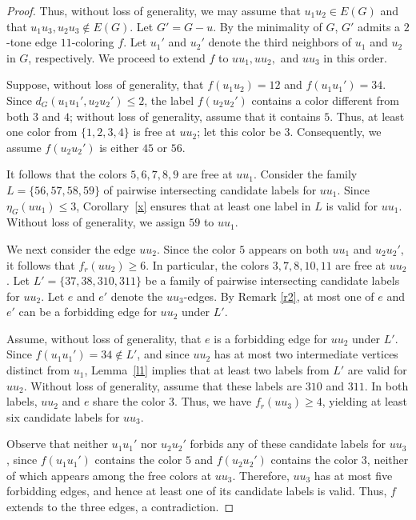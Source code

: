 \documentclass[12pt]{article}
\theoremstyle{plain}
\numberwithin{theorem}{section}
\numberwithin{conjecture}{section}
\numberwithin{corollary}{section}
\numberwithin{example}{section}
\numberwithin{lemma}{section}
\numberwithin{proposition}{section}
\numberwithin{problem}{section}
\numberwithin{remark}{section}
\numberwithin{claim}{theorem}
\numberwithin{definition}{section}
\begin{document}
\begin{proof}
\noindent Thus, without loss of generality, we may assume that $u_1u_2\in E(G)$ and that $u_1u_3,u_2u_3\notin E(G)$. Let $G' = G - u$. By the minimality of $G$, $G'$ admits a $2$-tone edge $11$-coloring $f$. Let $u_1'$ and $u_2'$ denote the third neighbors of $u_1$ and $u_2$ in $G$, respectively. We proceed to extend $f$ to $uu_1, uu_2,$ and $uu_3$ in this order.

\noindent Suppose, without loss of generality, that $f(u_1u_2)=12$ and $f(u_1u_1')=34$. Since $d_G(u_1u_1',u_2u_2')\le2$, the label $f(u_2u_2')$ contains a color different from both $3$ and $4$; without loss of generality, assume that it contains $5$. Thus, at least one color from $\{1,2,3,4\}$ is free at $uu_2$; let this color be $3$. Consequently, we assume $f(u_2u_2')$ is either $45$ or $56$.

\noindent It follows that the colors $5,6,7,8,9$ are free at $uu_1$. Consider the family $L=\{56, 57, 58, 59\}$ of pairwise intersecting candidate labels for $uu_1$. Since $\eta_G(uu_1)\le 3$, Corollary~\ref{x} ensures that at least one label in $L$ is valid for $uu_1$. Without loss of generality, we assign $59$ to $uu_1$.

\noindent We next consider the edge $uu_2$. Since the color $5$ appears on both $uu_1$ and $u_2u_2'$, it follows that $f_r(uu_2)\ge 6$. In particular, the colors $3,7,8,10,11$ are free at $uu_2$. Let $L'=\{37,38,310,311\}$ be a family of pairwise intersecting candidate labels for $uu_2$. Let $e$ and $e'$ denote the $uu_3$-edges. By Remark \ref{r2}, at most one of $e$ and $e'$ can be a forbidding edge for $uu_2$ under $L'$.

\noindent Assume, without loss of generality, that $e$ is a forbidding edge for $uu_2$ under $L'$. Since $f(u_1u_1')=34 \notin L'$, and since $uu_2$ has at most two intermediate vertices distinct from $u_1$, Lemma~\ref{l1} implies that at least two labels from $L'$ are valid for $uu_2$. Without loss of generality, assume that these labels are $310$ and $311$. In both labels, $uu_2$ and $e$ share the color $3$. Thus, we have $f_r(uu_3) \ge 4$, yielding at least six candidate labels for $uu_3$.

\noindent Observe that neither $u_1u_1'$ nor $u_2u_2'$ forbids any of these candidate labels for $uu_3$, since $f(u_1u_1')$ contains the color $5$ and $f(u_2u_2')$ contains the color $3$, neither of which appears among the free colors at $uu_3$. Therefore, $uu_3$ has at most five forbidding edges, and hence at least one of its candidate labels is valid. Thus, $f$ extends to the three edges, a contradiction.


\end{proof}
\end{document}
